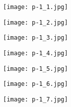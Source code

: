 
\begin{figure}
    \begin{center}
        \texttt{[image: p-1\_1.jpg]}
        \caption{}
    \end{center}
\end{figure}

\clearpage


\begin{figure}
    \begin{center}
        \texttt{[image: p-1\_2.jpg]}
        \caption{}
    \end{center}
\end{figure}

\clearpage


\begin{figure}
    \begin{center}
        \texttt{[image: p-1\_3.jpg]}
        \caption{}
    \end{center}
\end{figure}

\clearpage


\begin{figure}
    \begin{center}
        \texttt{[image: p-1\_4.jpg]}
        \caption{}
    \end{center}
\end{figure}

\clearpage


\begin{figure}
    \begin{center}
        \texttt{[image: p-1\_5.jpg]}
        \caption{}
    \end{center}
\end{figure}

\clearpage


\begin{figure}
    \begin{center}
        \texttt{[image: p-1\_6.jpg]}
        \caption{}
    \end{center}
\end{figure}

\clearpage


\begin{figure}
    \begin{center}
        \texttt{[image: p-1\_7.jpg]}
        \caption{}
    \end{center}
\end{figure}

